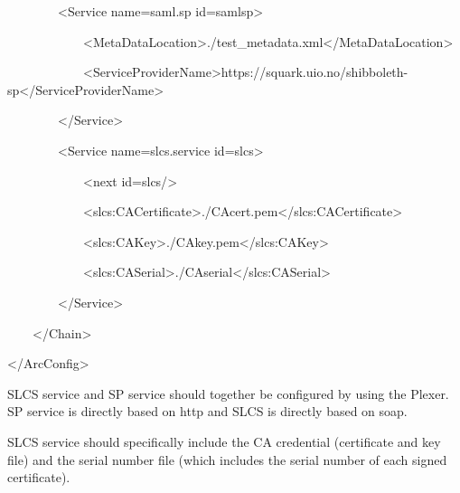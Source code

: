 \documentclass{article}
\begin{document}
{\ttfamily\color{black}
\ \ \ \ \ \ \ \ {\textless}Service
name={\textquotesingle}saml.sp{\textquotesingle}
id={\textquotesingle}samlsp{\textquotesingle}{\textgreater}}

{\ttfamily\color{black}
\ \ \ \ \ \ \ \ \ \ \ \ {\textless}MetaDataLocation{\textgreater}./test\_metadata.xml{\textless}/MetaDataLocation{\textgreater}}

{\ttfamily\color{black}
\ \ \ \ \ \ \ \ \ \ \ \ {\textless}ServiceProviderName{\textgreater}https://squark.uio.no/shibboleth-sp{\textless}/ServiceProviderName{\textgreater}}

{\ttfamily\color{black}
\ \ \ \ \ \ \ \ {\textless}/Service{\textgreater}}

{\ttfamily\color{black}
\ \ \ \ \ \ \ \ {\textless}Service
name={\textquotedbl}slcs.service{\textquotedbl}
id={\textquotedbl}slcs{\textquotedbl}{\textgreater}}

{\ttfamily\color{black}
\ \ \ \ \ \ \ \ \ \ \ \ {\textless}next
id={\textquotedbl}slcs{\textquotedbl}/{\textgreater}}

{\ttfamily\color{black}
\ \ \ \ \ \ \ \ \ \ \ \ {\textless}slcs:CACertificate{\textgreater}./CAcert.pem{\textless}/slcs:CACertificate{\textgreater}}

{\ttfamily\color{black}
\ \ \ \ \ \ \ \ \ \ \ \ {\textless}slcs:CAKey{\textgreater}./CAkey.pem{\textless}/slcs:CAKey{\textgreater}}

{\ttfamily\color{black}
\ \ \ \ \ \ \ \ \ \ \ \ {\textless}slcs:CASerial{\textgreater}./CAserial{\textless}/slcs:CASerial{\textgreater}}

{\ttfamily\color{black}
\ \ \ \ \ \ \ \ {\textless}/Service{\textgreater}}

{\ttfamily\color{black}
\ \ \ \ {\textless}/Chain{\textgreater}}

{\ttfamily\color{black}
{\textless}/ArcConfig{\textgreater}}

{\color{black}
SLCS service and SP service should together be configured by using the
Plexer. SP service is directly based on http and SLCS is directly based
on soap. }

{\color{black}
SLCS service should specifically include the CA credential (certificate
and key file) and the serial number file (which includes the serial
number of each signed certificate).}
\end{document}
